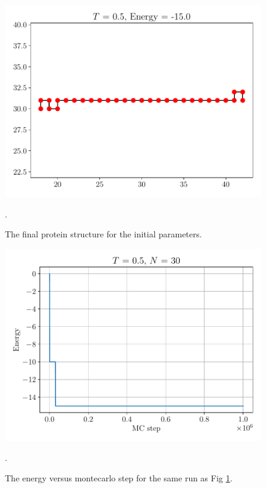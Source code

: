 \documentclass{article}
\begin{document}
\begin{figure}[h!]
    \centerline{\includegraphics[scale=0.6]{images/Q3b_final_protein_T5_N30_n1000000.pdf}}
    \caption{The final protein structure for the initial parameters. }.
    \label{fig:q3b_protein5}
\end{figure}
\begin{figure}[h!]
    \centerline{\includegraphics[scale=0.6]{images/Q3b_energy_vs_step_T5_N30_n1000000.pdf}}
    \caption{The energy versus montecarlo step for the same run as Fig \ref{fig:q3b_protein5}. }.
    \label{fig:q3b_energy5}
\end{figure}


\newpage
\hfill
\newpage
\hfill
\newpage
\end{document}
